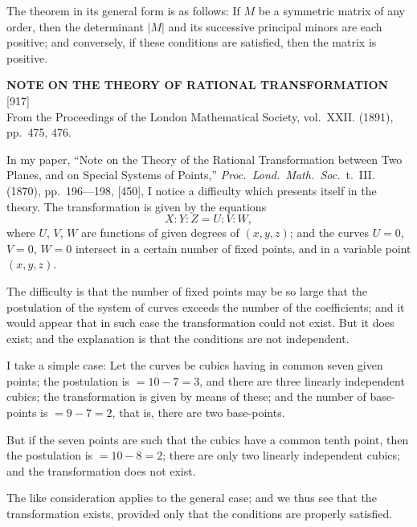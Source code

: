 \documentclass[11pt,a4paper]{article}
\newcommand{\paper}[4]{%
  \newpage
  \begin{center}
    {\large\bfseries #2}\\[0.5em]
    {\small [#1]}\\[0.3em]
    {\small #3}
  \end{center}
  \vspace{0.5em}
}
\begin{document}
\vspace{0.5em}
The theorem in its general form is as follows: If $M$ be a symmetric matrix of any order, then the determinant $|M|$ and its successive principal minors are each positive; and conversely, if these conditions are satisfied, then the matrix is positive.

\newpage
\paper{917}{NOTE ON THE THEORY OF RATIONAL TRANSFORMATION}{From the Proceedings of the London Mathematical Society, vol.~XXII. (1891), pp.~475, 476.}{}

In my paper, ``Note on the Theory of the Rational Transformation between Two Planes, and on Special Systems of Points,'' \textit{Proc.~Lond.~Math.~Soc.}\ t.~III. (1870), pp.~196---198, [450], I notice a difficulty which presents itself in the theory. The transformation is given by the equations
\[
X : Y : Z = U : V : W,
\]
where $U$, $V$, $W$ are functions of given degrees of $(x, y, z)$; and the curves $U = 0$, $V = 0$, $W = 0$ intersect in a certain number of fixed points, and in a variable point $(x, y, z)$.

\vspace{0.5em}
The difficulty is that the number of fixed points may be so large that the postulation of the system of curves exceeds the number of the coefficients; and it would appear that in such case the transformation could not exist. But it does exist; and the explanation is that the conditions are not independent.

\vspace{0.5em}
I take a simple case: Let the curves be cubics having in common seven given points; the postulation is $= 10 - 7 = 3$, and there are three linearly independent cubics; the transformation is given by means of these; and the number of base-points is $= 9 - 7 = 2$, that is, there are two base-points.

\vspace{0.5em}
But if the seven points are such that the cubics have a common tenth point, then the postulation is $= 10 - 8 = 2$; there are only two linearly independent cubics; and the transformation does not exist.

\vspace{0.5em}
The like consideration applies to the general case; and we thus see that the transformation exists, provided only that the conditions are properly satisfied.
\end{document}
